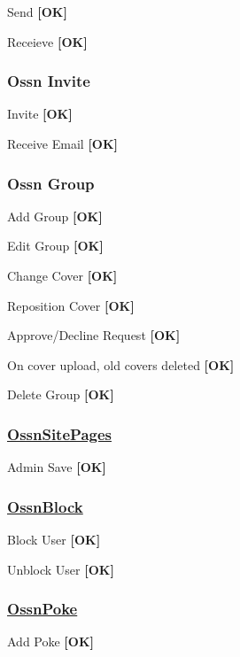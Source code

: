 \begin{DoxyItemize}
\item Send {\bfseries \mbox{[}OK\mbox{]}}
\item Receieve {\bfseries \mbox{[}OK\mbox{]}}
\end{DoxyItemize}

\subsubsection*{Ossn Invite}


\begin{DoxyItemize}
\item Invite {\bfseries \mbox{[}OK\mbox{]}}
\item Receive Email {\bfseries \mbox{[}OK\mbox{]}}
\end{DoxyItemize}

\subsubsection*{Ossn Group}


\begin{DoxyItemize}
\item Add Group {\bfseries \mbox{[}OK\mbox{]}}
\item Edit Group {\bfseries \mbox{[}OK\mbox{]}}
\item Change Cover {\bfseries \mbox{[}OK\mbox{]}}
\item Reposition Cover {\bfseries \mbox{[}OK\mbox{]}}
\item Approve/\+Decline Request {\bfseries \mbox{[}OK\mbox{]}}
\item On cover upload, old covers deleted {\bfseries \mbox{[}OK\mbox{]}}
\item Delete Group {\bfseries \mbox{[}OK\mbox{]}}
\end{DoxyItemize}

\subsubsection*{\hyperlink{class_ossn_site_pages}{Ossn\+Site\+Pages}}


\begin{DoxyItemize}
\item Admin Save {\bfseries \mbox{[}OK\mbox{]}}
\end{DoxyItemize}

\subsubsection*{\hyperlink{class_ossn_block}{Ossn\+Block}}


\begin{DoxyItemize}
\item Block User {\bfseries \mbox{[}OK\mbox{]}}
\item Unblock User {\bfseries \mbox{[}OK\mbox{]}}
\end{DoxyItemize}

\subsubsection*{\hyperlink{class_ossn_poke}{Ossn\+Poke}}


\begin{DoxyItemize}
\item Add Poke {\bfseries \mbox{[}OK\mbox{]}} 
\end{DoxyItemize}